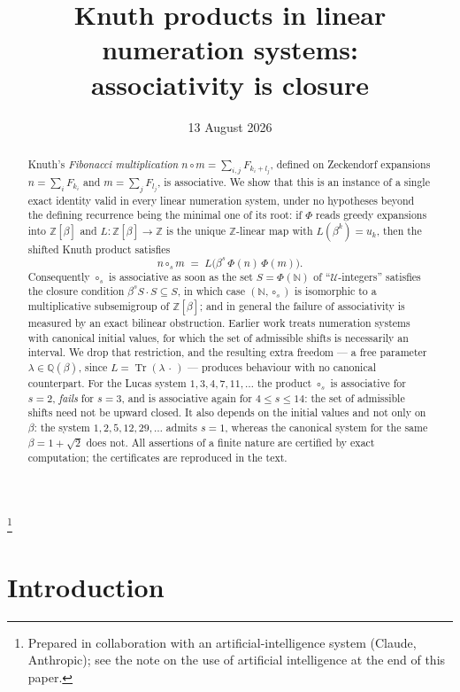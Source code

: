 \documentclass[11pt,reqno]{amsart}
\theoremstyle{plain}
\theoremstyle{definition}
\newcommand{\Z}{\mathbb{Z}}
\newcommand{\N}{\mathbb{N}}
\newcommand{\Q}{\mathbb{Q}}
\newcommand{\Uu}{\mathcal{U}}
\newcommand{\Tr}{\operatorname{Tr}}
\begin{document}
\title[Knuth products in linear numeration systems]
      {Knuth products in linear numeration systems:\\
       associativity is closure}

\author{}
\date{13 August 2026}
\thanks{Prepared in collaboration with an artificial-intelligence system (Claude, Anthropic);
see the note on the use of artificial intelligence at the end of this paper.}

\begin{abstract}
Knuth's \emph{Fibonacci multiplication} $n\circ m=\sum_{i,j}F_{k_i+l_j}$, defined on Zeckendorf
expansions $n=\sum_iF_{k_i}$ and $m=\sum_jF_{l_j}$, is associative. We show that this is an instance
of a single exact identity valid in every linear numeration system, under no hypotheses beyond the
defining recurrence being the minimal one of its root: if $\Phi$ reads greedy expansions into
$\Z[\beta]$ and $L\colon\Z[\beta]\to\Z$ is the unique $\Z$-linear map with $L(\beta^{k})=u_{k}$, then
the shifted Knuth product satisfies
\[
  n\circ_{s}m \;=\; L\bigl(\beta^{s}\,\Phi(n)\,\Phi(m)\bigr).
\]
Consequently $\circ_{s}$ is associative as soon as the set $S=\Phi(\N)$ of ``$\Uu$-integers''
satisfies the closure condition $\beta^{s}S\cdot S\subseteq S$, in which case $(\N,\circ_{s})$ is
isomorphic to a multiplicative subsemigroup of $\Z[\beta]$; and in general the failure of
associativity is measured by an exact bilinear obstruction. Earlier work treats numeration systems
with canonical initial values, for which the set of admissible shifts is necessarily an interval. We
drop that restriction, and the resulting extra freedom --- a free parameter $\lambda\in\Q(\beta)$,
since $L=\Tr(\lambda\,\cdot\,)$ --- produces behaviour with no canonical counterpart. For the Lucas
system $1,3,4,7,11,\dots$ the product $\circ_{s}$ is associative for $s=2$, \emph{fails} for $s=3$,
and is associative again for $4\le s\le14$: the set of admissible shifts need not be upward closed.
It also depends on the initial values and not only on $\beta$: the system $1,2,5,12,29,\dots$
admits $s=1$, whereas the canonical system for the same $\beta=1+\sqrt2$ does not. All assertions
of a finite nature are certified by exact computation; the certificates are reproduced in the text.
\end{abstract}

\maketitle

\section{Introduction}
\end{document}

